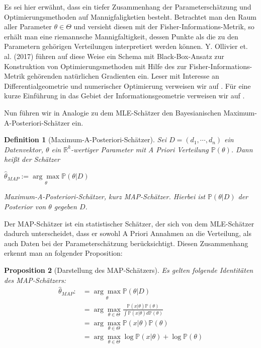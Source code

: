 \documentclass{report}
\theoremstyle{linebreak}
\newtheorem{defi}{Definition}%
\newtheorem{propo}[defi]{Proposition}
\begin{document}
Es sei hier erwähnt, dass ein tiefer Zusammenhang der Parameterschätzung und Optimierungsmethoden auf Mannigfaligketien besteht. Betrachtet man den Raum aller Parameter $\theta \in \Theta$ und versieht diesen mit der Fisher-Informations-Metrik, so erhält man eine riemannsche Mannigfaltigkeit, dessen Punkte als die zu den Parametern gehörigen Verteilungen interpretiert werden können. Y. Ollivier et. al. (2017) führen auf diese Weise ein Schema mit Black-Box-Ansatz zur Konstruktion von Optimierungsmethoden mit Hilfe des zur Fisher-Informations-Metrik gehörenden natürlichen Gradienten ein. Leser mit Interesse an Differentialgeometrie und numerischer Optimierung verweisen wir auf \cite{Info_Geom}. Für eine kurze Einführung in das Gebiet der Informationsgeometrie verweisen wir auf \cite{Info_Geom_intro}.

Nun führen wir in Analogie zu dem MLE-Schätzer den Bayesianischen Maximum-A-Posteriori-Schätzer ein.

\begin{defi}[Maximum-A-Posteriori-Schätzer]
	Sei $D = (d_1, \cdots, d_n)$ ein Datenvektor, $\theta$ ein $\mathbb{R}^k$-wertiger
	Parameter mit A Priori Verteilung $\mathbb{P}(\theta)$. Dann heißt der Schätzer
	\begin{center}
		$\hat{\theta}_{MAP} := \underset{\theta}{\arg \max} \mathbb{P}(\theta \vert 					D)$
	\end{center}
	\textit{Maximum-A-Posteriori-Schätzer}, kurz \textit{MAP-Schätzer}. Hierbei ist 
	$\mathbb{P}(\theta \vert D)$ der Posterior von $\theta$ gegeben $D$.
\end{defi}

Der MAP-Schätzer ist ein statistischer Schätzer, der sich von dem MLE-Schätzer dadurch unterscheidet, dass er sowohl A Priori Annahmen an die Verteilung, als auch Daten bei der Parameterschätzung berücksichtigt. Diesen Zusammenhang erkennt man an folgender Proposition:

\begin{propo}[Darstellung des MAP-Schätzers]
	Es gelten folgende Identitäten des MAP-Schätzers:
	\begin{align*}
	\hat{\theta}_{MAP} :&= \underset{\theta}{\arg \max} \mathbb{P}(\theta \vert D) \\
						&= \arg\underset{\theta \in \Theta}{\max} \frac{ \mathbb{P}(x									\vert\theta) \mathbb{P}(\theta)}{\int  \mathbb{P}(x\vert 									\theta) d\mathbb{P}(\theta)} \\
 						&= \arg\underset{\theta \in \Theta}{\max}  \mathbb{P}(x\vert 									\theta) \mathbb{P}(\theta) \\
					 	&= \arg\underset{\theta \in \Theta}{\max} \log\mathbb{P}(x\vert 								\theta) + \log \mathbb{P}(\theta)
	\end{align*}
\end{propo}
\end{document}
